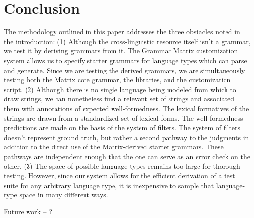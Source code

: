 \documentclass[11pt]{article}
\begin{document}
\section{Conclusion}

The methodology outlined in this paper addresses the three obstacles
noted in the introduction: (1) Although the cross-linguistic resource
itself isn't a grammar, we test it by deriving grammars from it.  The
Grammar Matrix customization system allows us to specify starter
grammars for language types which can parse and generate.  Since we
are testing the derived grammars, we are simultaneously testing both
the Matrix core grammar, the libraries, and the customization script.
(2) Although there is no single language being modeled from which to
draw strings, we can nonetheless find a relevant set of strings and
associated them with annotations of expected well-formedness.  The
lexical formatives of the strings are drawn from a standardized set
of lexical forms.  The well-formedness predictions are made on the basis
of the system of filters.  The system of filters doesn't represent
ground truth, but rather a second pathway to the judgments in 
addition to the direct use of the Matrix-derived starter grammars.
These pathways are independent enough that the one can serve as an
error check on the other. (3) The space of possible language types
remains too large for thorough testing.  However, since our system allows
for the efficient derivation of a test suite for any arbitrary
language type, it is inexpensive to sample that language-type space in
many different ways.

Future work -- ?










\end{document}
